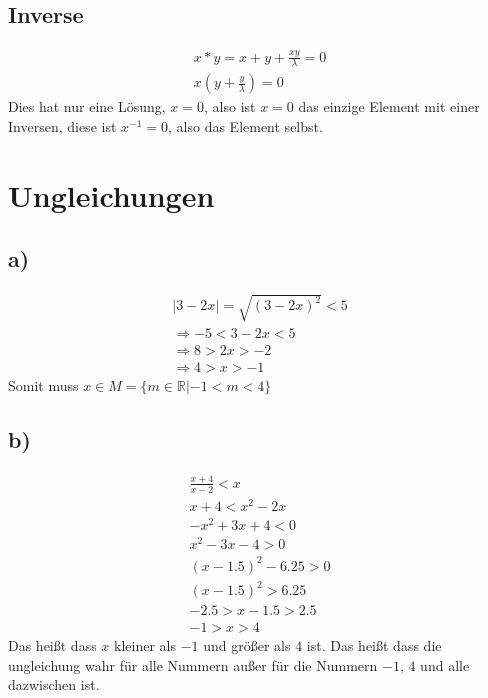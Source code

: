 \documentclass[]{scrartcl}
\begin{document}
\subsection{Inverse}
\begin{gather}
	x * y = x + y + \frac{xy}{\lambda} = 0\\
	x(y + \frac{y}{\lambda}) = 0
\end{gather}
Dies hat nur eine Lösung, $x=0$, also ist $x=0$ das einzige Element mit einer Inversen, diese ist $x^{-1} = 0$, also das Element selbst.


\section{Ungleichungen}
\subsection{a)}
\begin{gather}
	|3-2x| = \sqrt{(3-2x)^2} < 5\\
	\Rightarrow -5 < 3-2x < 5\\
	\Rightarrow 8 > 2x > -2\\
	\Rightarrow 4>x>-1
\end{gather}
Somit muss $x\in M = \{m\in\mathbb{R}| -1 < m < 4\}$

\subsection{b)}

\begin{gather}
	\frac{x+4}{x-2} < x\\
	x+ 4 < x^2 - 2x\\
	-x^2 + 3x + 4 < 0\\
	x^2 - 3x - 4 > 0\\
	(x - 1.5)^2 - 6.25 > 0\\
	(x -1.5)^2 > 6.25\\
	-2.5 > x-1.5 > 2.5\\
	-1 > x > 4
\end{gather}
Das heißt dass $x$ kleiner als $-1$ und größer als $4$ ist. Das heißt dass die ungleichung wahr für alle Nummern außer für die Nummern $-1$, $4$ und alle dazwischen ist.
\end{document}
